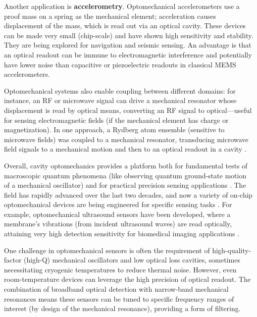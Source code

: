 Another application is \textbf{accelerometry}. Optomechanical
accelerometers use a proof mass on a spring as the mechanical element;
acceleration causes displacement of the mass, which is read out via an
optical cavity. These devices can be made very small (chip-scale) and
have shown high sensitivity and stability. They are being explored for
navigation and seismic sensing. An advantage is that an optical
readout can be immune to electromagnetic interference and potentially
have lower noise than capacitive or piezoelectric readouts in
classical MEMS accelerometers.



Optomechanical systems also enable coupling between different domains:
for instance, an RF or microwave signal can drive a mechanical
resonator whose displacement is read by optical means, converting an
RF signal to optical—useful for sensing electromagnetic fields (if the
mechanical element has charge or magnetization). In one approach, a
Rydberg atom ensemble (sensitive to microwave fields) was coupled to a
mechanical resonator, transducing microwave field signals to a
mechanical motion and then to an optical readout in a cavity .



Overall, cavity optomechanics provides a platform both for fundamental
tests of macroscopic quantum phenomena (like observing quantum
ground-state motion of a mechanical oscillator) and for practical
precision sensing applications . The field has rapidly advanced over
the last two decades, and now a variety of on-chip optomechanical
devices are being engineered for specific sensing tasks . For example,
optomechanical ultrasound sensors have been developed, where a
membrane’s vibrations (from incident ultrasound waves) are read
optically, attaining very high detection sensitivity for biomedical
imaging applications .



One challenge in optomechanical sensors is often the requirement of
high-quality-factor (high-Q) mechanical oscillators and low optical
loss cavities, sometimes necessitating cryogenic temperatures to
reduce thermal noise. However, even room-temperature devices can
leverage the high precision of optical readout. The combination of
broadband optical detection with narrow-band mechanical resonances
means these sensors can be tuned to specific frequency ranges of
interest (by design of the mechanical resonance), providing a form of
filtering.



